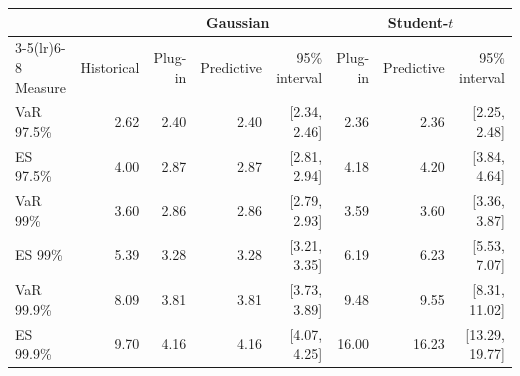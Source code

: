 \begin{tabular}{@{}lrrrrrrr@{}}
\toprule
 & & \multicolumn{3}{c}{Gaussian} & \multicolumn{3}{c}{Student-$t$} \\
\cmidrule(lr){3-5}\cmidrule(lr){6-8}
Measure & Historical & Plug-in & Predictive & 95\% interval & Plug-in & Predictive & 95\% interval \\
\midrule
VaR 97.5\% & 2.62 & 2.40 & 2.40 & [2.34, 2.46] & 2.36 & 2.36 & [2.25, 2.48] \\
ES 97.5\% & 4.00 & 2.87 & 2.87 & [2.81, 2.94] & 4.18 & 4.20 & [3.84, 4.64] \\
VaR 99\% & 3.60 & 2.86 & 2.86 & [2.79, 2.93] & 3.59 & 3.60 & [3.36, 3.87] \\
ES 99\% & 5.39 & 3.28 & 3.28 & [3.21, 3.35] & 6.19 & 6.23 & [5.53, 7.07] \\
VaR 99.9\% & 8.09 & 3.81 & 3.81 & [3.73, 3.89] & 9.48 & 9.55 & [8.31, 11.02] \\
ES 99.9\% & 9.70 & 4.16 & 4.16 & [4.07, 4.25] & 16.00 & 16.23 & [13.29, 19.77] \\
\bottomrule
\end{tabular}
